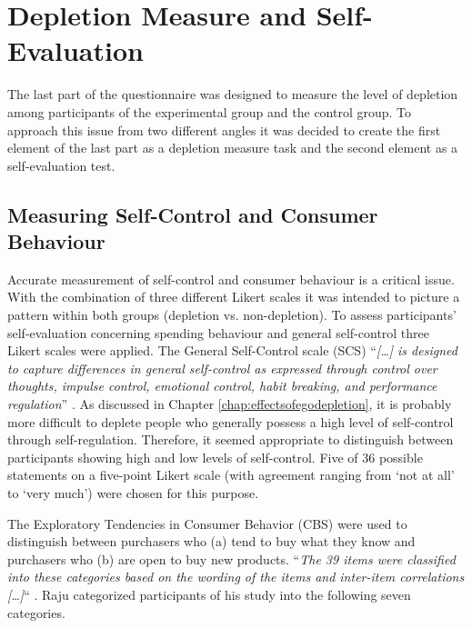 \FloatBarrier

\section{Depletion Measure and Self-Evaluation}\label{sec:depletion_measure_self_evaluation}
The last part of the questionnaire was designed to measure the level of depletion among participants of the experimental group and the control group. To approach this issue from two different angles it was decided to create the first element of the last part as a depletion measure task and the second element as a self-evaluation test.

\FloatBarrier

\subsection{Measuring Self-Control and Consumer Behaviour}
Accurate measurement of self-control and consumer behaviour is a critical issue. With the combination of three different Likert scales it was intended to picture a pattern within both groups (depletion vs. non-depletion). To assess participants’ self-evaluation concerning spending behaviour and general self-control three Likert scales were applied. The General Self-Control scale (SCS) “\emph{[\ldots] is designed to capture differences in general self-control as expressed through control over thoughts, impulse control, emotional control, habit breaking, and performance regulation}” \citep{tangney2004high}. As discussed in Chapter \ref{chap:effectsofegodepletion}, it is probably more difficult to deplete people who generally possess a high level of self-control through self-regulation. Therefore, it seemed appropriate to distinguish between participants showing high and low levels of self-control. Five of 36 possible statements on a five-point Likert scale (with agreement ranging from ‘not at all’ to ‘very much’) were chosen for this purpose.\par
The Exploratory Tendencies in Consumer Behavior (CBS) \citep{raju1980optimum} were used to distinguish between purchasers who (a) tend to buy what they know and purchasers who (b) are open to buy new products. “\emph{The 39 items were classified into these categories based on the wording of the items and inter-item correlations [\ldots]}“ \citep{raju1980optimum}. Raju categorized participants of his study into the following seven categories.\par

